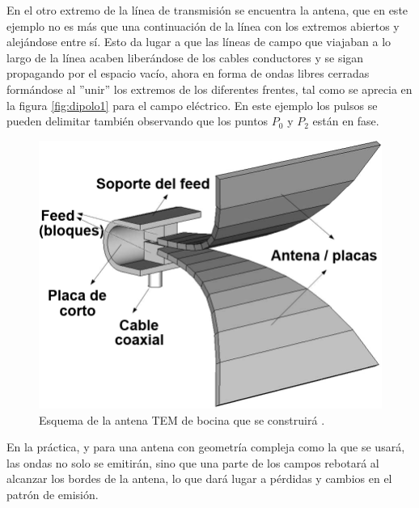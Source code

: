 \documentclass[11pt,a4paper,twoside,pdf]{article}
\numberwithin{equation}{section}
\begin{document}
En el otro extremo de la línea de transmisión se encuentra la antena, que en este ejemplo no es más que una continuación de la línea con los extremos abiertos y alejándose entre sí. Esto da lugar a que las líneas de campo que viajaban a lo largo de la línea acaben liberándose de los cables conductores y se sigan propagando por el espacio vacío, ahora en forma de ondas libres cerradas formándose al ''unir'' los extremos de los diferentes frentes, tal como se aprecia en la figura \ref{fig:dipolo1} para el campo eléctrico. En este ejemplo los pulsos se pueden delimitar también observando que los puntos $P_0$ y $P_2$ están en fase.
\begin{figure}
    \vspace{-0.12cm}
    \includegraphics[width=\linewidth]{img/fundTeo/antenaMallahzadeh.png}
    \vspace{-0.7cm}
    \caption{Esquema de la antena TEM de bocina que se construirá \cite{tem_horn}.}
    \label{fig:antenaMallahzadeh}
\end{figure}

En la práctica, y para una antena con geometría compleja como la que se usará, las ondas no solo se emitirán, sino que una parte de los campos rebotará al alcanzar los bordes de la antena, lo que dará lugar a pérdidas y cambios en el patrón de emisión.
\end{document}
